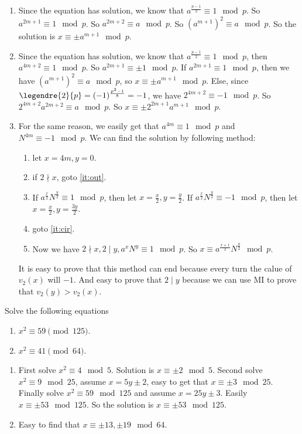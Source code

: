\documentclass{ctexart}
\begin{document}
\begin{enumerate}
  \item Since the equation has solution, we know that \(a^{\frac{p-1}{2}}\equiv 1 \mod p\).
    So \(a^{2m+1} \equiv 1 \mod p\). So \(a^{2m+2}\equiv a \mod p\).
    So \((a^{m+1})^2 \equiv a \mod p\). So the solution is \(x \equiv \pm a^{m+1} \mod p\).
  \item Since the equation has solution, we know that \(a^{\frac{p-1}{2}} \equiv 1 \mod p\), then \(a^{4m+2} \equiv 1 \mod p\).
    So \(a^{2m+1} \equiv \pm 1 \mod p\).
    If \(a^{2m+1}\equiv 1 \mod p\), then we have \((a^{m+1})^2 \equiv a \mod p\), so \(x \equiv \pm a^{m+1} \mod p\).
    Else, since \(\legendre{2}{p}=(-1)^{\frac{p^2-1}{8}}=-1\), we have \(2^{4m+2} \equiv -1 \mod p\).
    So \(2^{4m+2} a^{2m+2}\equiv a \mod p\). So \(x \equiv \pm 2^{2m+1}a^{m+1} \mod p\).
  \item For the same reason, we easily get that \(a^{4m} \equiv 1 \mod p\) and \(N^{4m} \equiv -1 \mod p\).
    We can find the solution by following method:
    \begin{enumerate}
      \item let \(x=4m,y=0\).
      \item \label{it:cir}if \(2 \nmid x\), goto \ref{it:out}.
      \item If \(a^{\frac{x}{2}}N^{\frac{y}{2}} \equiv 1 \mod p\), then let \(x=\frac{x}{2},y=\frac{y}{2}\).
        If \(a^{\frac{x}{2}}N^{\frac{y}{2}} \equiv -1 \mod p\), then let \(x=\frac{x}{2},y=\frac{3y}{2}\).
      \item goto \ref{it:cir}.
      \item \label{it:out} Now we have \(2 \nmid x,2 \mid y,a^x N^y \equiv 1 \mod p\).
        So \(x \equiv a^{\frac{x+1}{2}}N^{\frac{y}{2}} \mod p\).
    \end{enumerate}
    It is easy to prove that this method can end because every turn the calue of \(v_2(x)\) will \(-1\).
    And easy to prove that \(2 \mid y\) because we can use MI to prove that \(v_2(y)>v_2(x)\).
\end{enumerate}
\begin{problem}\label{pro:3}
  Solve the following equations
  \begin{enumerate}
    \item \(x^2 \equiv 59 \pmod{125}\).
    \item \(x^2 \equiv 41 \pmod{64}\).
  \end{enumerate}
\end{problem}
\begin{solution}
  \begin{enumerate}
    \item First solve \(x^2 \equiv 4 \mod 5\). Solution is \(x \equiv \pm 2 \mod 5\).
      Second solve \(x^2 \equiv 9 \mod 25\), assume \(x=5y \pm 2\), easy to get that \(x \equiv \pm 3 \mod 25\).
      Finally solve \(x^2 \equiv 59 \mod 125\) and assume \(x = 25y \pm 3\). Easily \(x \equiv \pm 53 \mod 125\).
      So the solution is \(x \equiv \pm 53 \mod 125\).
    \item Easy to find that \(x \equiv \pm 13,\pm 19 \mod 64\).
  \end{enumerate}
\end{solution}
\end{document}
